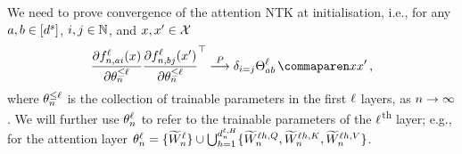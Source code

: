 We need to prove convergence of the attention NTK at initialisation, i.e., for any $a, b \in [d^s]$, $i, j \in \mathbb{N}$, and $x, x' \in \mathcal{X}$ 
\begin{align}
    \frac{
        \partial \indexedActivation{\depthSymbol}{\sequenceVariable, \fIndexA i}{\inputSymbol}
    }{
        \partial \params_{\sequenceVariable}^{\leq \depthSymbol}
    }
        \frac{
            \partial \indexedActivation{\depthSymbol}{\sequenceVariable, \fIndexB j}{\inputSymbol'}
        }{
            \partial \params_{\sequenceVariable}^{\leq \depthSymbol}
        }^\top
    \convergeProb
    \delta_{i=j}
    \ntkf{\fIndexA \fIndexB}{\depthSymbol}{\inputSymbol}{\inputSymbol'}
    \, ,
\end{align}
where $\theta_{n}^{\leq \ell}$ is the collection of trainable parameters in the first $\ell$ layers, as $n \to \infty$.
We will further use $\theta_{n}^{\ell}$ to refer to the trainable parameters of the $\ell$\textsuperscript{th} layer; e.g., for the attention layer $\theta_{n}^{\ell} = \{ \widetilde{W}_{n}^{\ell} \} \cup \bigcup_{h = 1}^{d_{n}^{\ell, H}} \{ \widetilde{W}_{n}^{\ell h, Q} , \widetilde{W}_{n}^{\ell h, K}, \widetilde{W}_{n}^{\ell h, V} \}$.

